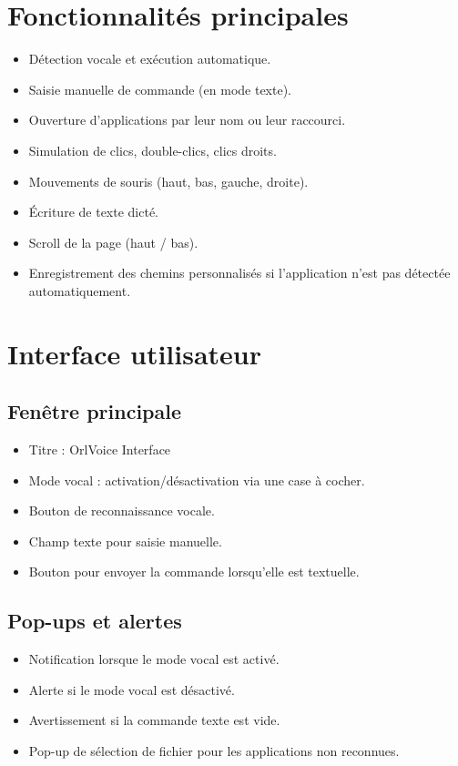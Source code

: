\documentclass[12pt]{article}
\begin{document}
	\section{Fonctionnalités principales}
	\begin{itemize}
		\item Détection vocale et exécution automatique.
		\item Saisie manuelle de commande (en mode texte).
		\item Ouverture d’applications par leur nom ou leur raccourci.
		\item Simulation de clics, double-clics, clics droits.
		\item Mouvements de souris (haut, bas, gauche, droite).
		\item Écriture de texte dicté.
		\item Scroll de la page (haut / bas).
		\item Enregistrement des chemins personnalisés si l’application n’est pas détectée automatiquement.
	\end{itemize}
	
	\section{Interface utilisateur}
	\subsection{Fenêtre principale}
	\begin{itemize}
		\item Titre : OrlVoice Interface
		\item Mode vocal : activation/désactivation via une case à cocher.
		\item Bouton de reconnaissance vocale.
		\item Champ texte pour saisie manuelle.
		\item Bouton pour envoyer la commande lorsqu'elle est textuelle.
	\end{itemize}
	
	\subsection{Pop-ups et alertes}
	\begin{itemize}
		\item Notification lorsque le mode vocal est activé.
		\item Alerte si le mode vocal est désactivé.
		\item Avertissement si la commande texte est vide.
		\item Pop-up de sélection de fichier pour les applications non reconnues.
	\end{itemize}
	
\end{document}
